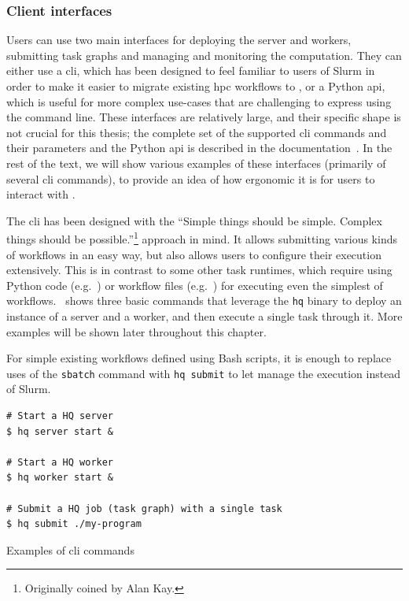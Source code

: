 \subsubsection*{Client interfaces}
Users can use two main interfaces for deploying the \hyperqueue{} server and workers,
submitting task graphs and managing and monitoring the computation. They can either use a
\gls{cli}, which has been designed to feel familiar to users of Slurm in order to
make it easier to migrate existing \gls{hpc} workflows to \hyperqueue{}, or
a Python \gls{api}, which is useful for more complex use-cases that are challenging
to express using the command line. These interfaces are relatively large, and their specific shape
is not crucial for this thesis; the complete set of the supported \gls{cli} commands
and their parameters and the Python \gls{api} is described in the
\hyperqueue{} documentation~\cite{hq_docs}. In the rest of the text, we will
show various examples of these interfaces (primarily of several \gls{cli} commands),
to provide an idea of how ergonomic it is for users to interact with \hyperqueue{}.

The \gls{cli} has been designed with the ``Simple things should be simple. Complex
things should be possible.''\footnote{Originally coined by Alan Kay.} approach in mind. It allows submitting various
kinds of workflows in an easy way, but also allows users to configure their execution extensively.
This is in contrast to some other task runtimes, which require using Python code (e.g.\
\dask{}) or workflow files (e.g.\ \snakemake{}) for executing even the
simplest of workflows.~\Autoref{lst:hq-cli-commands} shows three basic commands that leverage the
\texttt{hq} binary to deploy an instance of a \hyperqueue{} server and a
worker, and then execute a single task through it. More examples will be shown later throughout
this chapter.

For simple existing workflows defined using Bash scripts, it is enough to replace uses of the
\texttt{sbatch} command with \texttt{hq submit} to let \hyperqueue{} manage
the execution instead of Slurm.

\begin{listing}[h]
	\begin{verbatim}
# Start a HQ server
$ hq server start &

# Start a HQ worker
$ hq worker start &

# Submit a HQ job (task graph) with a single task
$ hq submit ./my-program
	\end{verbatim}
	\caption{Examples of \hyperqueue{} \gls{cli} commands}
	\label{lst:hq-cli-commands}
\end{listing}

